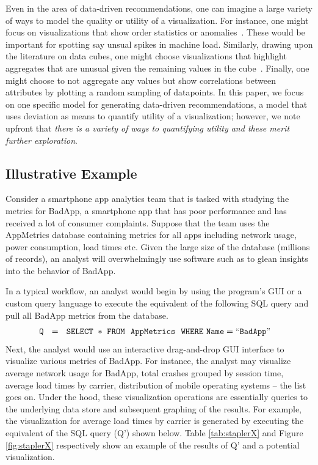 Even in the area of data-driven recommendations, one can imagine a large variety of ways to model the quality or utility
of a visualization.
For instance, one might focus on visualizations that show order statistics or anomalies~\cite{kandel}. 
These would be important for spotting say unsual spikes in machine load.
Similarly, drawing upon the literature on data cubes, one might choose visualizations that highlight aggregates that
are unusual given the remaining values in the cube~\cite{sarawagi}.
Finally, one might choose to not aggregate any values but show correlations between attributes by plotting a random
sampling of datapoints.
In this paper, we focus on one specific model for generating data-driven recommendations, a model that uses
deviation as means to quantify utility of a visualization; however, we note upfront
that {\it there is a variety of ways to quantifying utility and these merit further exploration}.


\subsection*{Illustrative Example}

Consider a smartphone app analytics team that is tasked with studying the metrics for BadApp, a smartphone app that has
poor performance and has received a lot of consumer complaints. 
Suppose that the team uses the AppMetrics database containing metrics for all apps including network usage, 
power consumption, load times etc.
Given the large size of the database (millions of records), an analyst will 
overwhelmingly use software such as \cite{} to glean insights into the behavior of BadApp.

In a typical workflow, an analyst would begin by using the program's GUI or a custom query language to execute the equivalent
of the following SQL query and pull all BadApp metrics from the database. 
\noindent 
\begin{align*}
& \tt Q \ \ = \ \ SELECT \ * \ FROM \ \  AppMetrics \ \ WHERE  \ Name=``BadApp"
\end{align*}
Next, the analyst would use an interactive drag-and-drop GUI interface to visualize various metrics of BadApp.
For instance, the analyst may visualize average network usage for BadApp, total crashes grouped by session time,
average load times by carrier, distribution of mobile operating systems -- the list goes on.
Under the hood, these visualization operations are essentially queries to the underlying data store and subsequent graphing of 
the results.
For example, the visualization for average load times by carrier is generated by executing the equivalent of the
SQL query (Q') shown below.
Table \ref{tab:staplerX} and Figure \ref{fig:staplerX} respectively show an example of the results of Q' and a potential
visualization.

